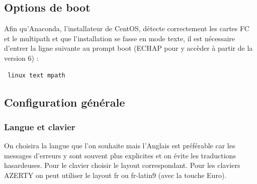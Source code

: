 \documentclass[a4paper,oneside]{report}
\begin{document}
\subsection{Options de boot}
Afin qu'Anaconda, l'installateur de CentOS, détecte correctement les cartes FC et le multipath et que l'installation se fasse en mode texte, il est nécessaire d'entrer la ligne suivante au prompt boot (ECHAP pour y accèder à partir de la version 6) :
\begin{verbatim} linux text mpath \end{verbatim}

\subsection{Configuration générale}
\subsubsection{Langue et clavier}
On choisira la langue que l'on souhaite mais l'Anglais est préférable car les messages d'erreurs y sont souvent plus explicites et on évite les traductions hasardeuses.\newline
Pour le clavier choisir le layout correspondant. Pour les claviers AZERTY on peut utiliser le layout fr ou fr-latin9 (avec la touche Euro).
\end{document}
